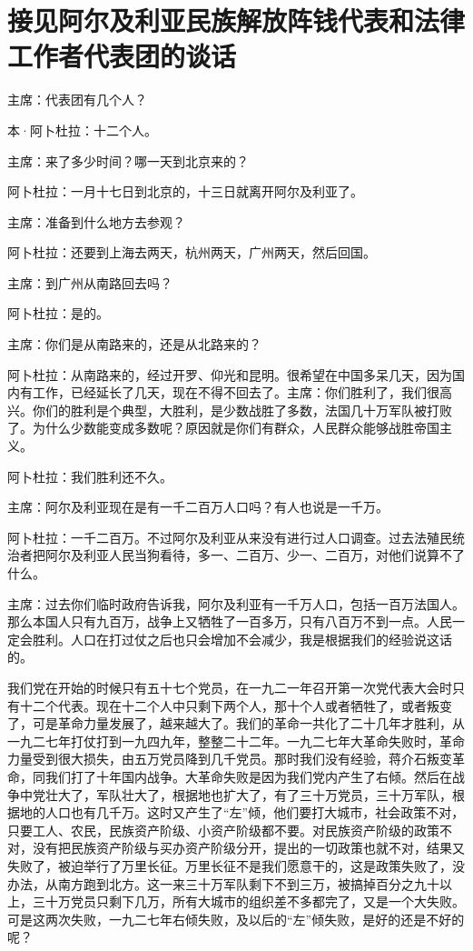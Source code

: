 \section[接见阿尔及利亚民族解放阵钱代表和法律工作者代表团的谈话（一九六四年一月二十八日）]{接见阿尔及利亚民族解放阵钱代表和法律工作者代表团的谈话}


主席：代表团有几个人？

本·阿卜杜拉：十二个人。

主席：来了多少时间？哪一天到北京来的？

阿卜杜拉：一月十七日到北京的，十三日就离开阿尔及利亚了。

主席：准备到什么地方去参观？

阿卜杜拉：还要到上海去两天，杭州两天，广州两天，然后回国。

主席：到广州从南路回去吗？

阿卜杜拉：是的。

主席：你们是从南路来的，还是从北路来的？

阿卜杜拉：从南路来的，经过开罗、仰光和昆明。很希望在中国多呆几天，因为国内有工作，已经延长了几天，现在不得不回去了。主席：你们胜利了，我们很高兴。你们的胜利是个典型，大胜利，是少数战胜了多数，法国几十万军队被打败了。为什么少数能变成多数呢？原因就是你们有群众，人民群众能够战胜帝国主义。

阿卜杜拉：我们胜利还不久。

主席：阿尔及利亚现在是有一千二百万人口吗？有人也说是一千万。

阿卜杜拉：一千二百万。不过阿尔及利亚从来没有进行过人口调查。过去法殖民统治者把阿尔及利亚人民当狗看待，多一、二百万、少一、二百万，对他们说算不了什么。

主席：过去你们临时政府告诉我，阿尔及利亚有一千万人口，包括一百万法国人。那么本国人只有九百万，战争上又牺牲了一百多万，只有八百万不到一点。人民一定会胜利。人口在打过仗之后也只会增加不会减少，我是根据我们的经验说这话的。

我们党在开始的时候只有五十七个党员，在一九二一年召开第一次党代表大会时只有十二个代表。现在十二个人中只剩下两个人，那十个人或者牺牲了，或者叛变了，可是革命力量发展了，越来越大了。我们的革命一共化了二十几年才胜利，从一九二七年打仗打到一九四九年，整整二十二年。一九二七年大革命失败时，革命力量受到很大损失，由五万党员降到几千党员。那时我们没有经验，蒋介石叛变革命，同我们打了十年国内战争。大革命失败是因为我们党内产生了右倾。然后在战争中党壮大了，军队壮大了，根据地也扩大了，有了三十万党员，三十万军队，根据地的人口也有几千万。这时又产生了“左”倾，他们要打大城市，社会政策不对，只要工人、农民，民族资产阶级、小资产阶级都不要。对民族资产阶级的政策不对，没有把民族资产阶级与买办资产阶级分开，提出的一切政策也就不对，结果又失败了，被迫举行了万里长征。万里长征不是我们愿意干的，这是政策失败了，没办法，从南方跑到北方。这一来三十万军队剩下不到三万，被搞掉百分之九十以上，三十万党员只剩下几万，所有大城市的组织差不多都完了，又是一个大失败。可是这两次失败，一九二七年右倾失败，及以后的“左”倾失败，是好的还是不好的呢？

